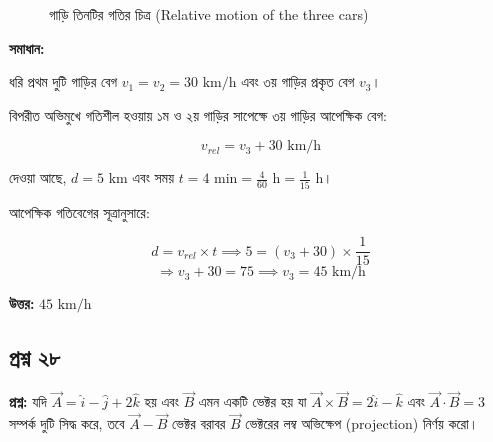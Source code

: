 \documentclass{article}
\begin{document}
\begin{figure}[h!]
\centering
{}
\caption{গাড়ি তিনটির গতির চিত্র (Relative motion of the three cars)}
\end{figure}

\textbf{সমাধান:}

ধরি প্রথম দুটি গাড়ির বেগ $v_1 = v_2 = 30\text{ km/h}$ এবং ৩য় গাড়ির প্রকৃত বেগ $v_3$।

বিপরীত অভিমুখে গতিশীল হওয়ায় ১ম ও ২য় গাড়ির সাপেক্ষে ৩য় গাড়ির আপেক্ষিক বেগ:

$$v_{rel} = v_3 + 30\text{ km/h}$$

দেওয়া আছে, $d = 5\text{ km}$ এবং সময় $t = 4\text{ min} = \frac{4}{60}\text{ h} = \frac{1}{15}\text{ h}$।

আপেক্ষিক গতিবেগের সূত্রানুসারে:

$$d = v_{rel} \times t \implies 5 = (v_3 + 30) \times \frac{1}{15}$$
$$\Rightarrow v_3 + 30 = 75 \implies v_3 = 45\text{ km/h}$$

\textbf{উত্তর:} $45\text{ km/h}$

\hrulefill

\subsection*{প্রশ্ন ২৮}
\textbf{প্রশ্ন:} যদি $\vec{A} = \hat{i} - \hat{j} + 2\hat{k}$ হয় এবং $\vec{B}$ এমন একটি ভেক্টর হয় যা $\vec{A} \times \vec{B} = 2\hat{i} - \hat{k}$ এবং $\vec{A} \cdot \vec{B} = 3$ সম্পর্ক দুটি সিদ্ধ করে, তবে $\vec{A} - \vec{B}$ ভেক্টর বরাবর $\vec{B}$ ভেক্টরের লম্ব অভিক্ষেপ (projection) নির্ণয় করো।
\end{document}
